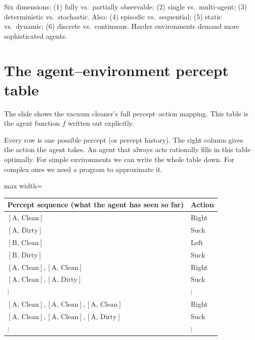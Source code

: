 \documentclass[a4paper,11pt]{article}
\begin{document}
\begin{keytake}
Six dimensions: (1) fully vs.\ partially observable; (2) single vs.\
multi-agent; (3) deterministic vs.\ stochastic.
Also: (4) episodic vs.\ sequential; (5) static vs.\ dynamic;
(6) discrete vs.\ continuous.
Harder environments demand more sophisticated agents.
\end{keytake}

\section{The agent--environment percept table}

The slide shows the vacuum cleaner's full percept--action mapping.
This table is the agent function $f$ written out explicitly.

\begin{intuition}
Every row is one possible percept (or percept history). The right column
gives the action the agent takes. An agent that always acts rationally
fills in this table optimally. For simple environments we can write the
whole table down. For complex ones we need a program to approximate it.
\end{intuition}

\begin{adjustbox}{max width=\linewidth}
\begin{tabular}{@{}ll@{}}
\toprule
\textbf{Percept sequence (what the agent has seen so far)} & \textbf{Action} \\
\midrule
$[\text{A, Clean}]$                              & Right \\
$[\text{A, Dirty}]$                              & Suck  \\
$[\text{B, Clean}]$                              & Left  \\
$[\text{B, Dirty}]$                              & Suck  \\
$[\text{A, Clean}],[\text{A, Clean}]$            & Right \\
$[\text{A, Clean}],[\text{A, Dirty}]$            & Suck  \\
$\vdots$                                         & $\vdots$ \\
$[\text{A, Clean}],[\text{A, Clean}],[\text{A, Clean}]$ & Right \\
$[\text{A, Clean}],[\text{A, Clean}],[\text{A, Dirty}]$ & Suck  \\
$\vdots$                                         & $\vdots$ \\
\bottomrule
\end{tabular}
\end{adjustbox}
\end{document}
